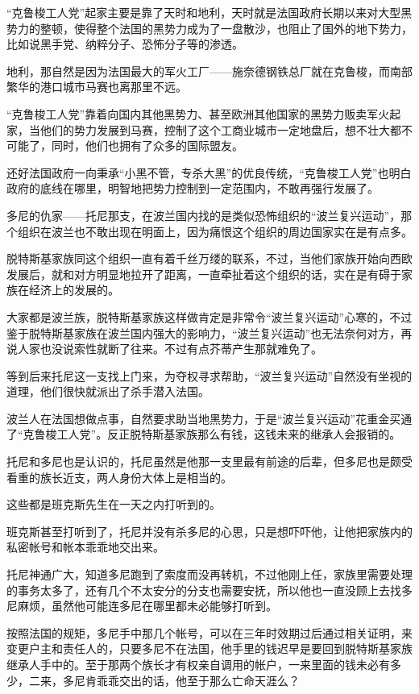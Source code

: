 “克鲁梭工人党”起家主要是靠了天时和地利，天时就是法国政府长期以来对大型黑势力的整顿，使得整个法国的黑势力成为了一盘散沙，也阻止了国外的地下势力，比如说黑手党、纳粹分子、恐怖分子等的渗透。

地利，那自然是因为法国最大的军火工厂——施奈德钢铁总厂就在克鲁梭，而南部繁华的港口城市马赛也离那里不远。

“克鲁梭工人党”靠着向国内其他黑势力、甚至欧洲其他国家的黑势力贩卖军火起家，当他们的势力发展到马赛，控制了这个工商业城市一定地盘后，想不壮大都不可能了，同时，他们也拥有了众多的国际盟友。

还好法国政府一向秉承“小黑不管，专杀大黑”的优良传统，“克鲁梭工人党”也明白政府的底线在哪里，明智地把势力控制到一定范围内，不敢再强行发展了。

多尼的仇家——托尼那支，在波兰国内找的是类似恐怖组织的“波兰复兴运动”，那个组织在波兰也不敢出现在明面上，因为痛恨这个组织的周边国家实在是有点多。

脱特斯基家族同这个组织一直有着千丝万缕的联系，不过，当他们家族开始向西欧发展后，就和对方明显地拉开了距离，一直牵扯着这个组织的话，实在是有碍于家族在经济上的发展的。

大家都是波兰族，脱特斯基家族这样做肯定是非常令“波兰复兴运动”心寒的，不过鉴于脱特斯基家族在波兰国内强大的影响力，“波兰复兴运动”也无法奈何对方，再说人家也没说索性就断了往来。不过有点芥蒂产生那就难免了。

等到后来托尼这一支找上门来，为夺权寻求帮助，“波兰复兴运动”自然没有坐视的道理，他们很快就派出了杀手潜入法国。

波兰人在法国想做点事，自然要求助当地黑势力，于是“波兰复兴运动”花重金买通了“克鲁梭工人党”。反正脱特斯基家族那么有钱，这钱未来的继承人会报销的。

托尼和多尼也是认识的，托尼虽然是他那一支里最有前途的后辈，但多尼也是颇受看重的族长近支，两人身份大体上是相当的。

这些都是班克斯先生在一天之内打听到的。

班克斯甚至打听到了，托尼并没有杀多尼的心思，只是想吓吓他，让他把家族内的私密帐号和帐本乖乖地交出来。

托尼神通广大，知道多尼跑到了索度而没再转机，不过他刚上任，家族里需要处理的事务太多了，还有几个不太安分的分支也需要安抚，所以他也一直没顾上去找多尼麻烦，虽然他可能连多尼在哪里都未必能够打听到。

按照法国的规矩，多尼手中那几个帐号，可以在三年时效期过后通过相关证明，来变更户主和责任人的，只要多尼不在法国，他手里的钱迟早是要回到脱特斯基家族继承人手中的。至于那两个族长才有权亲自调用的帐户，一来里面的钱未必有多少，二来，多尼肯乖乖交出的话，他至于那么亡命天涯么？

